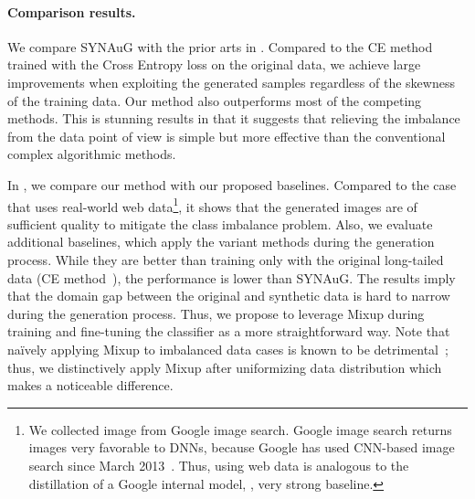 \paragraph{Comparison results.}
We compare SYNAuG with the prior arts in .
Compared to the CE method~\cite{cui2019class} trained with the Cross Entropy loss on the original data, we achieve large improvements when exploiting the generated samples regardless of the skewness of the training data.
Our method also outperforms 
most of the competing methods.
This is stunning results in that it
suggests 
that relieving the imbalance from the data point of view is simple but more effective than the conventional complex algorithmic methods.


In , we compare our method with our proposed baselines.
Compared to the case that uses real-world web data\footnote{We collected image from Google image search. Google image search returns images very favorable to DNNs, because Google has used CNN-based image search since March 2013~\cite{chen2015webly}. Thus, using web data is analogous to the distillation of a Google internal model, \ie, very strong baseline.}, it shows that the generated images are of sufficient quality to mitigate the class imbalance problem.
Also, we evaluate additional baselines, which apply the variant methods during the generation process.
While they are better than training only with the original long-tailed data (CE method~\cite{cui2019class}), the performance is lower than SYNAuG.
The results imply that the domain gap between the original and synthetic data is hard to narrow during the generation process.
Thus, we propose to leverage 
Mixup during training and fine-tuning the classifier as a more straightforward way.
Note that na\"ively applying Mixup to imbalanced data cases is known to be detrimental~\cite{yebin2023textmania}; thus, we distinctively apply Mixup after uniformizing data distribution which makes a noticeable difference.


